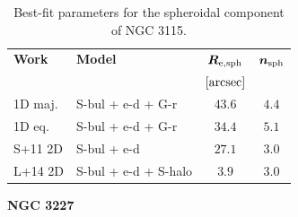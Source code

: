 \documentclass[preprint2]{emulateapj}
\begin{document}
  \begin{table}[h]
  \small
  \caption{Best-fit parameters for the spheroidal component of NGC 3115.}
  \begin{center}
  \begin{tabular}{llcc}
  \hline
  {\bf Work} & {\bf Model}   & $\bm R_{\rm e,sph}$    & $\bm n_{\rm sph}$ \\
    &  &  $[\rm arcsec]$ & \\
  \hline
  1D maj. & S-bul + e-d + G-r & $43.6$  &  $4.4$ \\
  1D eq.  & S-bul + e-d + G-r & $34.4$  &  $5.1$ \\
  \hline
  S+11 2D         & S-bul + e-d	       & $27.1$ &  $3.0$ \\
  L+14 2D         & S-bul + e-d + S-halo  & $3.9$  &  $3.0$ \\
  \hline
  \end{tabular}
  \end{center}
  \label{tab:n3115}
  \end{table}
    


  \clearpage\newpage\noindent
  {\bf NGC 3227 \\}
\end{document}
